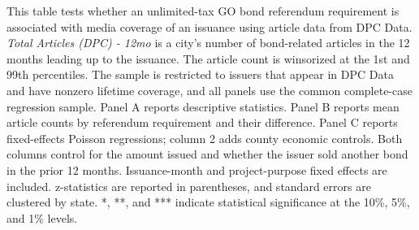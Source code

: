\newpage
\begin{table}[H]\centering
\def\sym#1{\ifmmode^{#1}\else\(^{#1}\)\fi}
\begingroup
\caption{\textbf{GO bond referendums and bond-related media coverage from DPC Data}}
\label{tab:dpc_media}

\parbox{\textwidth}{This table tests whether an unlimited-tax GO bond referendum requirement is associated with media coverage of an issuance using article data from DPC Data. \textit{Total Articles (DPC) - 12mo} is a city's number of bond-related articles in the 12 months leading up to the issuance. The article count is winsorized at the 1st and 99th percentiles. The sample is restricted to issuers that appear in DPC Data and have nonzero lifetime coverage, and all panels use the common complete-case regression sample. Panel A reports descriptive statistics. Panel B reports mean article counts by referendum requirement and their difference. Panel C reports fixed-effects Poisson regressions; column 2 adds county economic controls. Both columns control for the amount issued and whether the issuer sold another bond in the prior 12 months. Issuance-month and project-purpose fixed effects are included. z-statistics are reported in parentheses, and standard errors are clustered by state. *, **, and *** indicate statistical significance at the 10\%, 5\%, and 1\% levels.}
\endgroup
\end{table}


